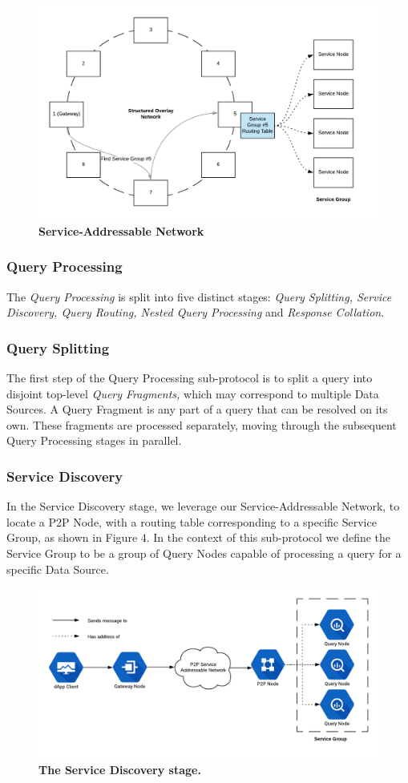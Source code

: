 \documentclass[12pt]{article}
\begin{document}
\begin{figure}[H]
\vspace*{5mm}
\caption{\textbf{Service-Addressable Network}}
\includegraphics[width=1\textwidth]{media/image6.png}
\end{figure}
\subsubsection*{Query Processing}
The \textit{Query Processing} is split into five distinct stages: \textit{Query Splitting, Service Discovery, Query Routing, Nested Query Processing} and \textit{Response Collation}.
\subsubsection*{Query Splitting}
The first step of the Query Processing sub-protocol is to split a query into disjoint top-level \textit{Query Fragments,} which may correspond to multiple Data Sources. A Query Fragment is any part of a query that can be resolved on its own. These fragments are processed separately, moving through the subsequent Query Processing stages in parallel.
\subsubsection*{Service Discovery}
In the Service Discovery stage, we leverage our Service-Addressable Network, to locate a P2P Node, with a routing table corresponding to a specific Service Group, as shown in Figure 4. In the context of this sub-protocol we define the Service Group to be a group of Query Nodes capable of processing a query for a specific Data Source.
\begin{figure}[H]
\caption{\textbf{The Service Discovery stage.}}
\includegraphics[width=1\textwidth]{media/image10.png}
\end{figure}
\end{document}
